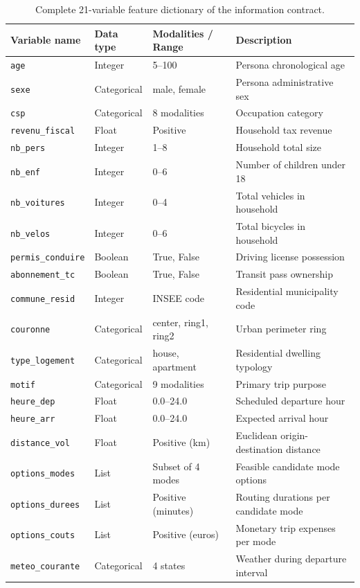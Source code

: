 \begin{table}[t]
\centering
\caption{Complete 21-variable feature dictionary of the information contract.}
\label{tab-feature-dict}
\small
\begin{tabularx}{\textwidth}{l l l X}
\toprule
\textbf{Variable name} & \textbf{Data type} & \textbf{Modalities / Range} & \textbf{Description} \\
\midrule
\texttt{age} & Integer & 5--100 & Persona chronological age \\
\texttt{sexe} & Categorical & male, female & Persona administrative sex \\
\texttt{csp} & Categorical & 8 modalities & Occupation category \\
\texttt{revenu\_fiscal} & Float & Positive & Household tax revenue \\
\texttt{nb\_pers} & Integer & 1--8 & Household total size \\
\texttt{nb\_enf} & Integer & 0--6 & Number of children under 18 \\
\texttt{nb\_voitures} & Integer & 0--4 & Total vehicles in household \\
\texttt{nb\_velos} & Integer & 0--6 & Total bicycles in household \\
\texttt{permis\_conduire} & Boolean & True, False & Driving license possession \\
\texttt{abonnement\_tc} & Boolean & True, False & Transit pass ownership \\
\texttt{commune\_resid} & Integer & INSEE code & Residential municipality code \\
\texttt{couronne} & Categorical & center, ring1, ring2 & Urban perimeter ring \\
\texttt{type\_logement} & Categorical & house, apartment & Residential dwelling typology \\
\texttt{motif} & Categorical & 9 modalities & Primary trip purpose \\
\texttt{heure\_dep} & Float & 0.0--24.0 & Scheduled departure hour \\
\texttt{heure\_arr} & Float & 0.0--24.0 & Expected arrival hour \\
\texttt{distance\_vol} & Float & Positive (km) & Euclidean origin-destination distance \\
\texttt{options\_modes} & List & Subset of 4 modes & Feasible candidate mode options \\
\texttt{options\_durees} & List & Positive (minutes) & Routing durations per candidate mode \\
\texttt{options\_couts} & List & Positive (euros) & Monetary trip expenses per mode \\
\texttt{meteo\_courante} & Categorical & 4 states & Weather during departure interval \\
\bottomrule
\end{tabularx}
\end{table}


